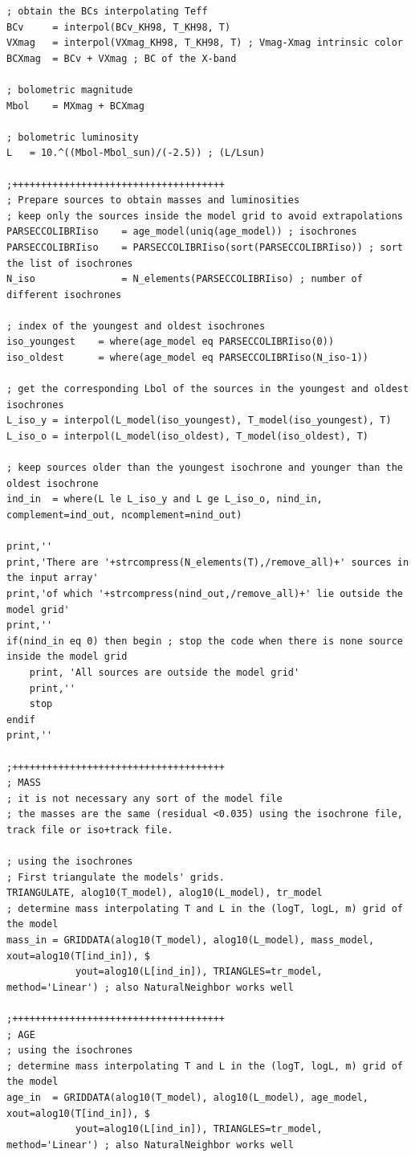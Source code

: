 \documentclass[12pt]{article}
\begin{document}
{\begin{Verbatim}[tabsize=4]
; obtain the BCs interpolating Teff
BCv		= interpol(BCv_KH98, T_KH98, T)
VXmag	= interpol(VXmag_KH98, T_KH98, T) ; Vmag-Xmag intrinsic color
BCXmag	= BCv + VXmag ; BC of the X-band

; bolometric magnitude
Mbol	= MXmag + BCXmag

; bolometric luminosity
L	= 10.^((Mbol-Mbol_sun)/(-2.5)) ; (L/Lsun)

;+++++++++++++++++++++++++++++++++++++
; Prepare sources to obtain masses and luminosities
; keep only the sources inside the model grid to avoid extrapolations
PARSECCOLIBRIiso	= age_model(uniq(age_model)) ; isochrones
PARSECCOLIBRIiso	= PARSECCOLIBRIiso(sort(PARSECCOLIBRIiso)) ; sort the list of isochrones
N_iso				= N_elements(PARSECCOLIBRIiso) ; number of different isochrones

; index of the youngest and oldest isochrones
iso_youngest	= where(age_model eq PARSECCOLIBRIiso(0))
iso_oldest		= where(age_model eq PARSECCOLIBRIiso(N_iso-1))

; get the corresponding Lbol of the sources in the youngest and oldest isochrones
L_iso_y	= interpol(L_model(iso_youngest), T_model(iso_youngest), T)
L_iso_o	= interpol(L_model(iso_oldest), T_model(iso_oldest), T)

; keep sources older than the youngest isochrone and younger than the oldest isochrone
ind_in	= where(L le L_iso_y and L ge L_iso_o, nind_in, complement=ind_out, ncomplement=nind_out)

print,''
print,'There are '+strcompress(N_elements(T),/remove_all)+' sources in the input array'
print,'of which '+strcompress(nind_out,/remove_all)+' lie outside the model grid'
print,''
if(nind_in eq 0) then begin ; stop the code when there is none source inside the model grid
	print, 'All sources are outside the model grid'
	print,''
	stop
endif
print,''

;+++++++++++++++++++++++++++++++++++++
; MASS
; it is not necessary any sort of the model file
; the masses are the same (residual <0.035) using the isochrone file, track file or iso+track file.

; using the isochrones
; First triangulate the models' grids.
TRIANGULATE, alog10(T_model), alog10(L_model), tr_model
; determine mass interpolating T and L in the (logT, logL, m) grid of the model
mass_in	= GRIDDATA(alog10(T_model), alog10(L_model), mass_model, xout=alog10(T[ind_in]), $ 
			yout=alog10(L[ind_in]), TRIANGLES=tr_model, method='Linear') ; also NaturalNeighbor works well

;+++++++++++++++++++++++++++++++++++++
; AGE
; using the isochrones
; determine mass interpolating T and L in the (logT, logL, m) grid of the model
age_in	= GRIDDATA(alog10(T_model), alog10(L_model), age_model, xout=alog10(T[ind_in]), $ 
			yout=alog10(L[ind_in]), TRIANGLES=tr_model, method='Linear') ; also NaturalNeighbor works well


\end{Verbatim}}
\end{document}
